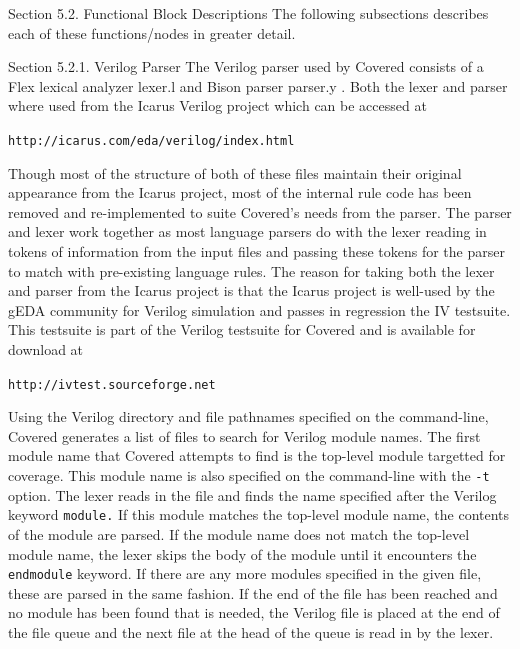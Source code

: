 \begin{Desc}
\item[Section 5.2. Functional Block Descriptions]The following subsections describes each of these functions/nodes in greater detail.\end{Desc}
\begin{Desc}
\item[Section 5.2.1. Verilog Parser]The Verilog parser used by Covered consists of a Flex lexical analyzer lexer.l and Bison parser parser.y . Both the lexer and parser where used from the Icarus Verilog project which can be accessed at\end{Desc}
\begin{Desc}
\item[]{\tt http://icarus.com/eda/verilog/index.html}\end{Desc}
\begin{Desc}
\item[]Though most of the structure of both of these files maintain their original appearance from the Icarus project, most of the internal rule code has been removed and re-implemented to suite Covered's needs from the parser. The parser and lexer work together as most language parsers do with the lexer reading in tokens of information from the input files and passing these tokens for the parser to match with pre-existing language rules. The reason for taking both the lexer and parser from the Icarus project is that the Icarus project is well-used by the g\-EDA community for Verilog simulation and passes in regression the IV testsuite. This testsuite is part of the Verilog testsuite for Covered and is available for download at\end{Desc}
\begin{Desc}
\item[]{\tt http://ivtest.sourceforge.net}\end{Desc}
\begin{Desc}
\item[]Using the Verilog directory and file pathnames specified on the command-line, Covered generates a list of files to search for Verilog module names. The first module name that Covered attempts to find is the top-level module targetted for coverage. This module name is also specified on the command-line with the {\tt -t}  option. The lexer reads in the file and finds the name specified after the Verilog keyword {\tt module.}  If this module matches the top-level module name, the contents of the module are parsed. If the module name does not match the top-level module name, the lexer skips the body of the module until it encounters the {\tt endmodule}  keyword. If there are any more modules specified in the given file, these are parsed in the same fashion. If the end of the file has been reached and no module has been found that is needed, the Verilog file is placed at the end of the file queue and the next file at the head of the queue is read in by the lexer.\end{Desc}
